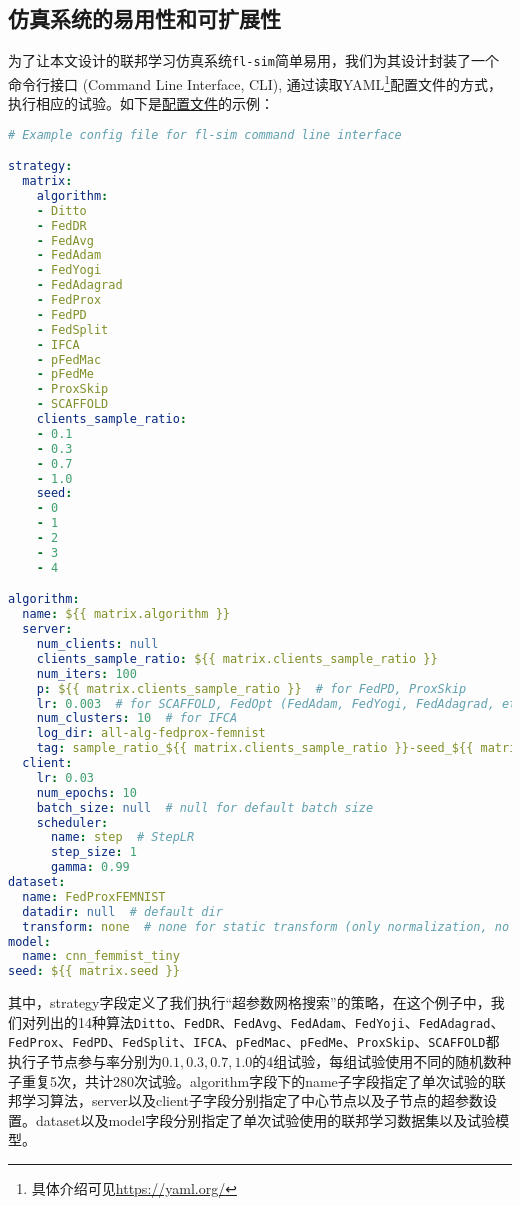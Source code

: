 \subsection{仿真系统的易用性和可扩展性}

为了让本文设计的联邦学习仿真系统\texttt{fl-sim}简单易用，我们为其设计封装了一个命令行接口 (Command Line Interface, CLI), 通过读取YAML\footnote{具体介绍可见\url{https://yaml.org/}}配置文件的方式，执行相应的试验。如下是\href{https://github.com/wenh06/fl-sim/blob/master/example-configs/all-alg-fedprox-femnist.yml}{配置文件}的示例：
\begin{lstlisting}[language=yaml]
# Example config file for fl-sim command line interface

strategy:
  matrix:
    algorithm:
    - Ditto
    - FedDR
    - FedAvg
    - FedAdam
    - FedYogi
    - FedAdagrad
    - FedProx
    - FedPD
    - FedSplit
    - IFCA
    - pFedMac
    - pFedMe
    - ProxSkip
    - SCAFFOLD
    clients_sample_ratio:
    - 0.1
    - 0.3
    - 0.7
    - 1.0
    seed:
    - 0
    - 1
    - 2
    - 3
    - 4

algorithm:
  name: ${{ matrix.algorithm }}
  server:
    num_clients: null
    clients_sample_ratio: ${{ matrix.clients_sample_ratio }}
    num_iters: 100
    p: ${{ matrix.clients_sample_ratio }}  # for FedPD, ProxSkip
    lr: 0.003  # for SCAFFOLD, FedOpt (FedAdam, FedYogi, FedAdagrad, etc.), this parameter is quite sensitive
    num_clusters: 10  # for IFCA
    log_dir: all-alg-fedprox-femnist
    tag: sample_ratio_${{ matrix.clients_sample_ratio }}-seed_${{ matrix.seed }}
  client:
    lr: 0.03
    num_epochs: 10
    batch_size: null  # null for default batch size
    scheduler:
      name: step  # StepLR
      step_size: 1
      gamma: 0.99
dataset:
  name: FedProxFEMNIST
  datadir: null  # default dir
  transform: none  # none for static transform (only normalization, no augmentation)
model:
  name: cnn_femmist_tiny
seed: ${{ matrix.seed }}
\end{lstlisting}
其中，strategy字段定义了我们执行``超参数网格搜索''的策略，在这个例子中，我们对列出的14种算法\texttt{Ditto}、\texttt{FedDR}、\texttt{FedAvg}、\texttt{FedAdam}、\texttt{FedYoji}、\texttt{FedAdagrad}、\texttt{FedProx}、\texttt{FedPD}、\texttt{FedSplit}、\texttt{IFCA}、\texttt{pFedMac}、\texttt{pFedMe}、\texttt{ProxSkip}、\texttt{SCAFFOLD}都执行子节点参与率分别为$0.1, 0.3, 0.7, 1.0$的4组试验，每组试验使用不同的随机数种子重复5次，共计280次试验。algorithm字段下的name子字段指定了单次试验的联邦学习算法，server以及client子字段分别指定了中心节点以及子节点的超参数设置。dataset以及model字段分别指定了单次试验使用的联邦学习数据集以及试验模型。

